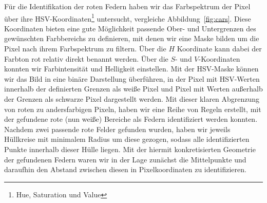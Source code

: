 \documentclass[10pt]{article}
\begin{document}
    Für die Identifikation der roten Federn haben wir das Farbspektrum der Pixel über ihre HSV-Koordinaten\footnote{Hue, Saturation und Value} untersucht, vergleiche Abbildung~\ref{fig:cars}.
    Diese Koordinaten bieten eine gute Möglichkeit passende Ober- und Untergrenzen des gewünschten Farbbereichs zu definieren, mit denen wir eine Maske bilden um die Pixel nach ihrem Farbspektrum zu filtern.
    Über die $H$ Koordinate kann dabei der Farbton rot relativ direkt benannt werden.
    Über die $S$- und $V$-Koordinaten konnten wir Farbintensität und Helligkeit einstellen.
    Mit der HSV-Maske können wir das Bild in eine binäre Darstellung überführen, in der Pixel mit HSV-Werten innerhalb der definierten Grenzen als weiße Pixel und Pixel mit Werten außerhalb der Grenzen als schwarze Pixel dargestellt werden.
    Mit dieser klaren Abgrenzung von roten zu andersfarbigen Pixeln, haben wir eine Reihe von Regeln erstellt, mit der gefundene rote (nun weiße) Bereiche als Federn identifiziert werden konnten.
    Nachdem zwei passende rote Felder gefunden wurden, haben wir jeweils Hüllkreise mit minimalem Radius um diese gezogen, sodass alle identifizierten Punkte innerhalb dieser Hülle liegen.
    Mit der hiermit konkretisierten Geometrie der gefundenen Federn waren wir in der Lage zunächst die Mittelpunkte und daraufhin den Abstand zwischen diesen in Pixelkoordinaten zu identifizieren.
\end{document}
